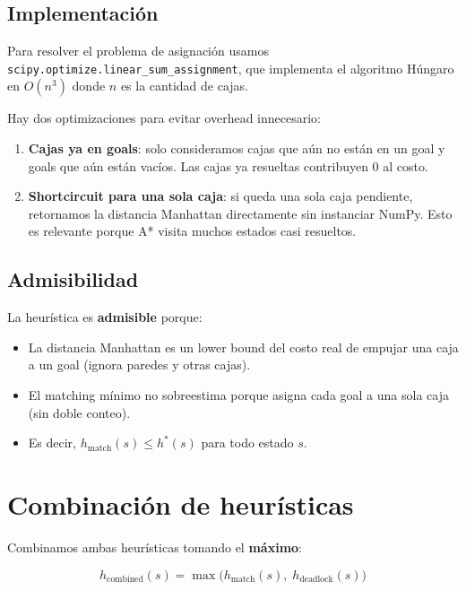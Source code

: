 \documentclass[12pt, a4paper]{article}
\begin{document}
\subsection{Implementación}

Para resolver el problema de asignación usamos \texttt{scipy.optimize.linear\_sum\_assignment}, que implementa el algoritmo Húngaro en $O(n^3)$ donde $n$ es la cantidad de cajas.

Hay dos optimizaciones para evitar overhead innecesario:

\begin{enumerate}
  \item \textbf{Cajas ya en goals}: solo consideramos cajas que aún no están en un goal y goals que aún están vacíos. Las cajas ya resueltas contribuyen 0 al costo.
  \item \textbf{Shortcircuit para una sola caja}: si queda una sola caja pendiente, retornamos la distancia Manhattan directamente sin instanciar NumPy. Esto es relevante porque A* visita muchos estados casi resueltos.
\end{enumerate}

\subsection{Admisibilidad}

La heurística es \textbf{admisible} porque:
\begin{itemize}
  \item La distancia Manhattan es un lower bound del costo real de empujar una caja a un goal (ignora paredes y otras cajas).
  \item El matching mínimo no sobreestima porque asigna cada goal a una sola caja (sin doble conteo).
  \item Es decir, $h_{\text{match}}(s) \leq h^*(s)$ para todo estado $s$.
\end{itemize}

\section{Combinación de heurísticas}

Combinamos ambas heurísticas tomando el \textbf{máximo}:

$$h_{\text{combined}}(s) = \max\big(h_{\text{match}}(s),\; h_{\text{deadlock}}(s)\big)$$
\end{document}
